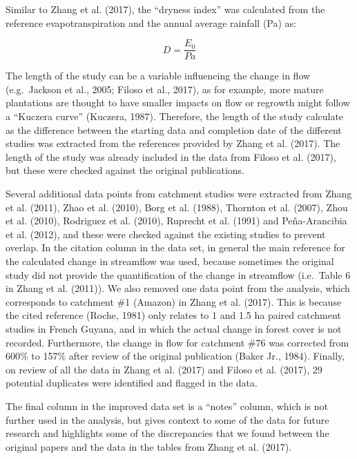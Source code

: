 \documentclass[]{elsarticle} %
\begin{document}
Similar to Zhang et al. (2017), the ``dryness index'' was calculated from the reference evapotranspiration and the annual average rainfall (Pa) as:

\begin{equation}
D = \frac{E_{0}}{Pa} \label{eq:eq1}
\end{equation}

The length of the study can be a variable influencing the change in flow (e.g.~Jackson et al., 2005; Filoso et al., 2017), as for example, more mature plantations are thought to have smaller impacts on flow or regrowth might follow a ``Kuczera curve'' (Kuczera, 1987). Therefore, the length of the study calculate as the difference between the starting data and completion date of the different studies was extracted from the references provided by Zhang et al. (2017). The length of the study was already included in the data from Filoso et al. (2017), but these were checked against the original publications.

Several additional data points from catchment studies were extracted from Zhang et al. (2011), Zhao et al. (2010), Borg et al. (1988), Thornton et al. (2007), Zhou et al. (2010), Rodriguez et al. (2010), Ruprecht et al. (1991) and Peña-Arancibia et al. (2012), and these were checked against the existing studies to prevent overlap. In the citation column in the data set, in general the main reference for the calculated change in streamflow was used, because sometimes the original study did not provide the quantification of the change in streamflow (i.e.~Table 6 in Zhang et al. (2011)).
We also removed one data point from the analysis, which corresponds to catchment \#1 (Amazon) in Zhang et al. (2017). This is because the cited reference (Roche, 1981) only relates to 1 and 1.5 ha paired catchment studies in French Guyana, and in which the actual change in forest cover is not recorded. Furthermore, the change in flow for catchment \#76 was corrected from 600\% to 157\% after review of the original publication (Baker Jr., 1984). Finally, on review of all the data in Zhang et al. (2017) and Filoso et al. (2017), 29 potential duplicates were identified and flagged in the data.

The final column in the improved data set is a ``notes'' column, which is not further used in the analysis, but gives context to some of the data for future research and highlights some of the discrepancies that we found between the original papers and the data in the tables from Zhang et al. (2017).
\end{document}
